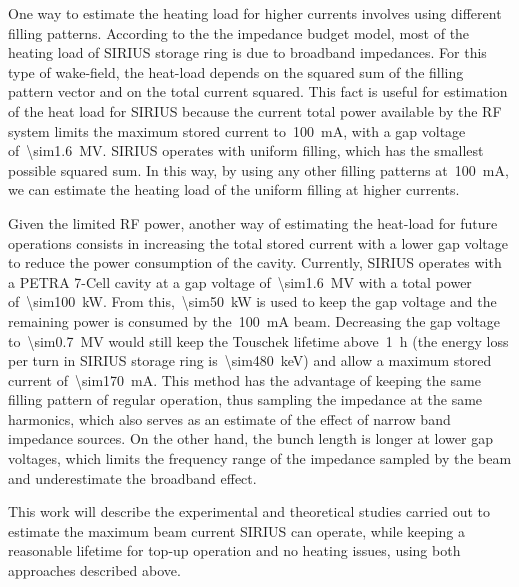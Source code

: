 \documentclass
[
    a4paper,
]{jacow}
\begin{document}
    One way to estimate the heating load for higher currents involves using different filling patterns. According to the the impedance budget model, most of the heating load of SIRIUS storage ring is due to broadband impedances. For this type of wake-field, the heat-load depends on the squared sum of the filling pattern vector and on the total current squared. This fact is useful for estimation of the heat load for SIRIUS because the current total power available by the RF system limits the maximum stored current to~\SI{100}{\milli\ampere}, with a gap voltage of~\SI{\sim1.6}{\mega\volt}. SIRIUS operates with uniform filling, which has the smallest possible squared sum. In this way, by using any other filling patterns at~\SI{100}{\milli\ampere}, we can estimate the heating load of the uniform filling at higher currents.

    Given the limited RF power, another way of estimating the heat-load for future operations consists in increasing the total stored current with a lower gap voltage to reduce the power consumption of the cavity. Currently, SIRIUS operates with a PETRA 7-Cell cavity at a gap voltage of~\SI{\sim1.6}{\mega\volt} with a total power of~\SI{\sim100}{\kilo\watt}. From this,~\SI{\sim50}{\kilo\watt} is used to keep the gap voltage and the remaining power is consumed by the~\SI{100}{\milli\ampere} beam. Decreasing the gap voltage to~\SI{\sim0.7}{\mega\volt} would still keep the Touschek lifetime above~\SI{1}{\hour} (the energy loss per turn in SIRIUS storage ring is~\SI{\sim480}{\kilo\electronvolt}) and allow a maximum stored current of~\SI{\sim170}{\milli\ampere}. This method has the advantage of keeping the same filling pattern of regular operation, thus sampling the impedance at the same harmonics, which also serves as an estimate of the effect of narrow band impedance sources. On the other hand, the bunch length is longer at lower gap voltages, which limits the frequency range of the impedance sampled by the beam and underestimate the broadband effect. 

    This work will describe the experimental and theoretical studies carried out to estimate the maximum beam current SIRIUS can operate, while keeping a reasonable lifetime for top-up operation and no heating issues, using both approaches described above.
\end{document}
